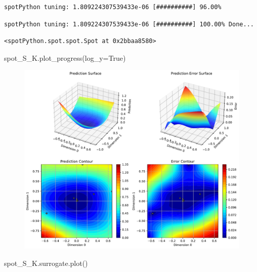 \documentclass[
  letterpaper,
  DIV=11,
  numbers=noendperiod]{scrreprt}
\newenvironment{Shaded}{\begin{snugshade}}{\end{snugshade}}
\newcommand{\NormalTok}[1]{\textcolor[rgb]{0.00,0.23,0.31}{#1}}
\newcommand{\OperatorTok}[1]{\textcolor[rgb]{0.37,0.37,0.37}{#1}}
\newcommand{\VariableTok}[1]{\textcolor[rgb]{0.07,0.07,0.07}{#1}}
\begin{document}
\begin{verbatim}
spotPython tuning: 1.809224307539433e-06 [##########] 96.00% 
\end{verbatim}

\begin{verbatim}
spotPython tuning: 1.809224307539433e-06 [##########] 100.00% Done...
\end{verbatim}

\begin{verbatim}
<spotPython.spot.spot.Spot at 0x2bbaa8580>
\end{verbatim}

\begin{Shaded}
\begin{Highlighting}[]
\NormalTok{spot\_S\_K.plot\_progress(log\_y}\OperatorTok{=}\VariableTok{True}\NormalTok{)}
\end{Highlighting}
\end{Shaded}

\begin{figure}[H]

{\centering \includegraphics{012_num_spot_ei_files/figure-pdf/cell-40-output-1.pdf}

}

\end{figure}

\begin{Shaded}
\begin{Highlighting}[]
\NormalTok{spot\_S\_K.surrogate.plot()}
\end{Highlighting}
\end{Shaded}
\end{document}
